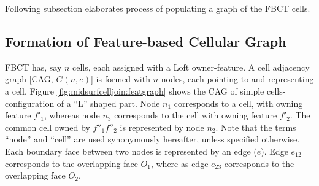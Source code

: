 Following subsection elaborates process of populating a graph of the FBCT cells.

\subsection{Formation of Feature-based Cellular Graph}

FBCT has, say $n$ cells, each assigned with a Loft owner-feature. A cell adjacency graph [CAG, $G(n,e)$] is formed with $n$ nodes, each pointing to and representing a cell. Figure \ref{fig:midsurfcelljoin:featgraph} shows the CAG of simple cells-configuration of a ``L'' shaped part. Node $n_1$ corresponds to a cell, with owning feature $f'_1$, whereas node $n_3$ corresponds to the cell with owning feature $f'_2$. The common cell owned by $ f''_1f''_2$ is represented by node $n_2$. Note that the terms ``node'' and ``cell'' are used synonymously hereafter, unless specified otherwise. Each boundary face between two nodes is represented by an edge ($e$). Edge $e_{12}$ corresponds to the overlapping face $O_1$, where as  edge $e_{23}$ corresponds to the overlapping face $O_2$. 



